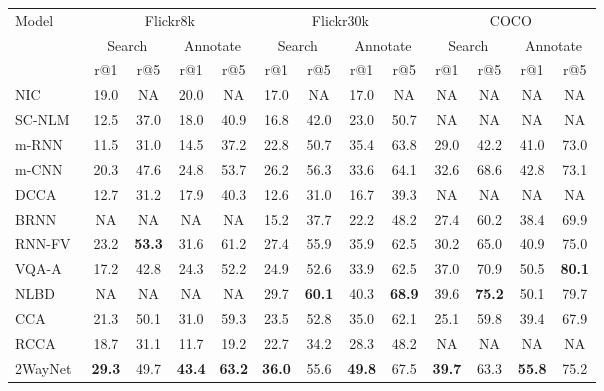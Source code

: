 \documentclass[10pt,twocolumn,letterpaper]{article}
\begin{document}
\begin{table*}[t]
\centering
\begin{tabular}{|l|c|c|c|c|c|c|c|c|c|c|c|c|}
\hline
\multirow{3}{*}{Model} & \multicolumn{4}{c|}{Flickr8k} & \multicolumn{4}{c|}{Flickr30k} & \multicolumn{4}{c|}{COCO}\\
\cline{2-13}
& \multicolumn{2}{c|}{Search} & \multicolumn{2}{c|}{Annotate} & \multicolumn{2}{c|}{Search} & \multicolumn{2}{c|}{Annotate} & \multicolumn{2}{c|}{Search} & \multicolumn{2}{c|}{Annotate}\\
\cline{2-13}
& r@1 & r@5 & r@1 & r@5 & r@1 & r@5 & r@1 & r@5 & r@1 & r@5 & r@1 & r@5 \\
\hline
 {NIC~\cite{DBLP:conf/cvpr/VinyalsTBE15}} & 19.0 & NA & 20.0 & NA & 17.0 & NA & 17.0 & NA & NA & NA & NA & NA\\
 {SC-NLM~\cite{DBLP:journals/corr/KirosSZ14}} & 12.5 & 37.0 & 18.0 & 40.9 & 16.8 & 42.0 & 23.0 & 50.7 & NA & NA & NA & NA\\
 {m-RNN~\cite{DBLP:journals/corr/MaoXYWY14}} & 11.5 & 31.0 & 14.5 & 37.2 &  22.8 & 50.7 & 35.4 & 63.8 & 29.0 & 42.2 & 41.0 & 73.0\\
 {m-CNN~\cite{DBLP:conf/iccv/MaLSL15}} & 20.3 & 47.6 & 24.8 & 53.7 &  26.2 & 56.3 & 33.6 & 64.1 & 32.6 & 68.6 & 42.8 & 73.1 \\
 {DCCA~\cite{dcca_text}} & 12.7 & 31.2 & 17.9 & 40.3  & 12.6 & 31.0 & 16.7 & 39.3 & NA & NA & NA & NA\\
 {BRNN~\cite{DBLP:conf/cvpr/KarpathyL15}} & NA & NA & NA & NA & 15.2 & 37.7 & 22.2 & 48.2 & 27.4 &60.2 & 38.4 & 69.9\\
 {RNN-FV~\cite{DBLP:RNNfish}} & 23.2 & \textbf{53.3} & 31.6 & 61.2 & 27.4 & 55.9 & 35.9  & 62.5 & 30.2 & 65.0 & 40.9 & 75.0 \\
 {VQA-A~\cite{DBLP:journals/corr/LinP16}} & 17.2 & 42.8 & 24.3 & 52.2 & 24.9 & 52.6 & 33.9 & 62.5 & 37.0 & 70.9 & 50.5 & \textbf{80.1} \\
 {NLBD~\cite{DBLP:journals/corr/WangLL15}} & NA & NA & NA & NA &29.7 & \textbf{60.1} & 40.3 & \textbf{68.9} & 39.6 & \textbf{75.2}  & 50.1 & 79.7\\
 \hline
 {CCA~\cite{Klein_2015_CVPR}} & 21.3 & 50.1 & 31.0 & 59.3 & 23.5 & 52.8 & 35.0 & 62.1 & 25.1 & 59.8 & 39.4 & 67.9\\
 {RCCA~\cite{rcca}} & 18.7 & 31.1 & 11.7 & 19.2 & 22.7 & 34.2 & 28.3 & 48.2 & NA & NA & NA & NA\\
 {2WayNet} & \textbf{29.3} & 49.7 & \textbf{43.4} & \textbf{63.2} & \textbf{36.0} & 55.6 & \textbf{49.8} & 67.5 & \textbf{39.7} & 63.3 & \textbf{55.8} & 75.2 \\

\end{tabular}
\end{table*}
\end{document}
